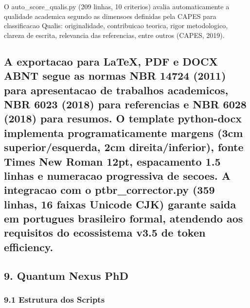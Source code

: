 \documentclass[
  12pt,
]{article}
\begin{document}
O auto\_score\_qualis.py (209 linhas, 10 criterios) avalia
automaticamente a qualidade academica segundo as dimensoes definidas
pela CAPES para classificacao Qualis: originalidade, contribuicao
teorica, rigor metodologico, clareza de escrita, relevancia das
referencias, entre outros (CAPES, 2019).

\subsection{A exportacao para LaTeX, PDF e DOCX ABNT segue as normas NBR
14724 (2011) para apresentacao de trabalhos academicos, NBR 6023 (2018)
para referencias e NBR 6028 (2018) para resumos. O template python-docx
implementa programaticamente margens (3cm superior/esquerda, 2cm
direita/inferior), fonte Times New Roman 12pt, espacamento 1.5 linhas e
numeracao progressiva de secoes. A integracao com o ptbr\_corrector.py
(359 linhas, 16 faixas Unicode CJK) garante saida em portugues
brasileiro formal, atendendo aos requisitos do ecossistema v3.5 de token
efficiency.}\label{a-exportacao-para-latex-pdf-e-docx-abnt-segue-as-normas-nbr-14724-2011-para-apresentacao-de-trabalhos-academicos-nbr-6023-2018-para-referencias-e-nbr-6028-2018-para-resumos.-o-template-python-docx-implementa-programaticamente-margens-3cm-superioresquerda-2cm-direitainferior-fonte-times-new-roman-12pt-espacamento-1.5-linhas-e-numeracao-progressiva-de-secoes.-a-integracao-com-o-ptbr_corrector.py-359-linhas-16-faixas-unicode-cjk-garante-saida-em-portugues-brasileiro-formal-atendendo-aos-requisitos-do-ecossistema-v3.5-de-token-efficiency.}

\subsection{9. Quantum Nexus PhD}\label{quantum-nexus-phd}

\subsubsection{9.1 Estrutura dos Scripts}\label{estrutura-dos-scripts}
\end{document}
